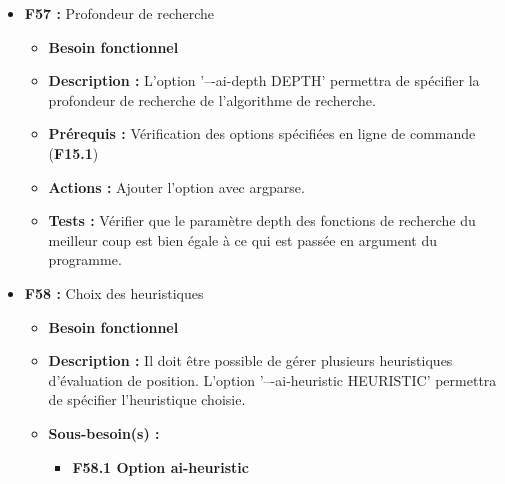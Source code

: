 \documentclass{article}
\begin{document}
\begin{itemize}
\begin{itemize}
\begin{itemize}
\begin{itemize}
            \end{itemize}
            \smallskip
            \item \textbf{F56.2 Fonction MCTS}
            \begin{itemize}
                \item \textbf{Prérequis :} Heuristiques (\textbf{F52, F59}), Profondeur de recherche (\textbf{F57})
                \item \textbf{Actions :} Implémenter la fonction \textit{monte\_carlo\_tree\_search(board, player, time\_limit)}.
                \item \textbf{Tests :} Vérifier avec un plateau aléatoire qu'un résultat correct est renvoyé après time\_limit.
            \end{itemize}
        \end{itemize}
    \end{itemize}
\bigskip
    \item \textbf{F57 :} Profondeur de recherche
    \begin{itemize}
        \item \textbf{Besoin fonctionnel}
        \item \textbf{Description :} L’option ’–-ai-depth DEPTH’ permettra de spécifier la profondeur de recherche de l’algorithme de recherche. 
        \item \textbf{Prérequis :} Vérification des options spécifiées en ligne de commande (\textbf{F15.1})
        \item \textbf{Actions :} Ajouter l’option avec argparse.
        \item \textbf{Tests :} Vérifier que le paramètre depth des fonctions de recherche du meilleur coup est bien égale à ce qui est passée en argument du programme.
    \end{itemize}
\bigskip
    \item \label{heuristique2} \textbf{F58 :} Choix des heuristiques
    \begin{itemize}
        \item \textbf{Besoin fonctionnel}
        \item \textbf{Description :} Il doit être possible de gérer plusieurs heuristiques d’évaluation de position. L’option ’–-ai-heuristic HEURISTIC’ permettra de spécifier l’heuristique choisie.
        \item \textbf{Sous-besoin(s) :}
        \begin{itemize}
            \smallskip
            \item \textbf{F58.1 Option ai-heuristic}

\end{itemize}
\end{itemize}
\end{itemize}
\end{document}
